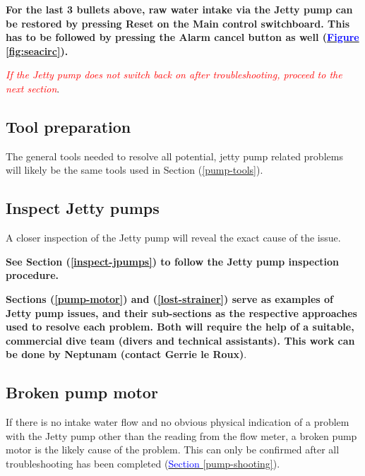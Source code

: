 \documentclass[
  12pt,
]{report}
\begin{document}
\textbf{For the last 3 bullets above, raw water intake via the Jetty
pump can be restored by pressing Reset on the Main control switchboard.
This has to be followed by pressing the Alarm cancel button as well
(\ul{\textcolor{blue}{Figure \ref{fig:seacirc}}}).}

\emph{\textcolor{red}{If the Jetty pump does not switch back on after troubleshooting, proceed to the next section}}.

\hypertarget{tool-preparation-4}{%
\subsection{Tool preparation}\label{tool-preparation-4}}

The general tools needed to resolve all potential, jetty pump related
problems will likely be the same tools used in Section
(\ul{\textcolor{blue}{\ref{pump-tools}}}).

\hypertarget{inspect-jetty-pumps-1}{%
\subsection{Inspect Jetty pumps}\label{inspect-jetty-pumps-1}}

A closer inspection of the Jetty pump will reveal the exact cause of the
issue.

\textbf{See Section (\ul{\textcolor{blue}{\ref{inspect-jpumps}}}) to
follow the Jetty pump inspection procedure.}

\textbf{Sections (\ul{\textcolor{blue}{\ref{pump-motor}}}) and
(\ul{\textcolor{blue}{\ref{lost-strainer}}}) serve as examples of Jetty
pump issues, and their sub-sections as the respective approaches used to
resolve each problem. Both will require the help of a suitable,
commercial dive team (divers and technical assistants). This work can be
done by Neptunam (contact Gerrie le Roux)}.

\hypertarget{broken-pump-motor}{%
\subsection{\texorpdfstring{Broken pump motor
\label{pump-motor}}{Broken pump motor }}\label{broken-pump-motor}}

If there is no intake water flow and no obvious physical indication of a
problem with the Jetty pump other than the reading from the flow meter,
a broken pump motor is the likely cause of the problem. This can only be
confirmed after all troubleshooting has been completed
(\ul{\textcolor{blue}{Section \ref{pump-shooting}}}).
\end{document}
